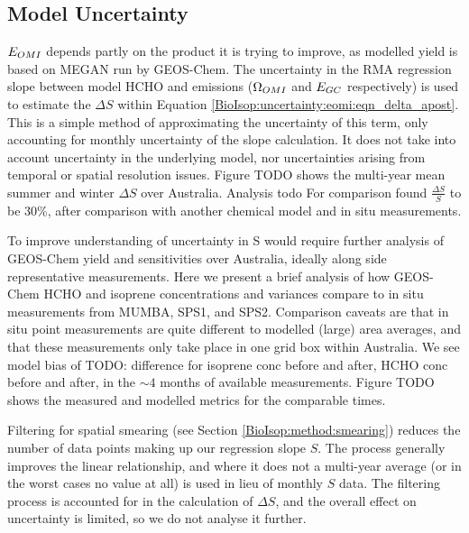     
  
  \subsection{Model Uncertainty}
    \label{BioIsop:uncertainty:Model}
    
    $E_{OMI}$ depends partly on the product it is trying to improve, as modelled yield is based on MEGAN run by GEOS-Chem.
    The uncertainty in the RMA regression slope between model HCHO and emissions ($\Omega_{OMI}$ and $E_{GC}$ respectively) is used to estimate the $\Delta S$ within Equation \ref{BioIsop:uncertainty:eomi:eqn_delta_apost}.
    This is a simple method of approximating the uncertainty of this term, only accounting for monthly uncertainty of the slope calculation.
    It does not take into account uncertainty in the underlying model, nor uncertainties arising from temporal or spatial resolution issues.
    Figure TODO shows the multi-year mean summer and winter $\Delta S$ over Australia.
    Analysis todo
    For comparison \textcite{Palmer2006} found $\frac{\Delta S}{S}$ to be 30\%, after comparison with another chemical model and in situ measurements.
    
    To improve understanding of uncertainty in S would require further analysis of GEOS-Chem yield and sensitivities over Australia, ideally along side representative measurements.
    Here we present a brief analysis of how GEOS-Chem HCHO and isoprene concentrations and variances compare to in situ measurements from MUMBA, SPS1, and SPS2.
    Comparison caveats are that in situ point measurements are quite different to modelled (large) area averages, and that these measurements only take place in one grid box within Australia.
    We see model bias of TODO: difference for isoprene conc before and after, HCHO conc before and after, in the $\sim 4$ months of available measurements.
    Figure TODO shows the measured and modelled metrics for the comparable times.
    
    Filtering for spatial smearing (see Section \ref{BioIsop:method:smearing}) reduces the number of data points making up our regression slope $S$. 
    The process generally improves the linear relationship, and where it does not a multi-year average (or in the worst cases no value at all) is used in lieu of monthly $S$ data.
    The filtering process is accounted for in the calculation of $\Delta S$, and the overall effect on uncertainty is limited, so we do not analyse it further.
    
